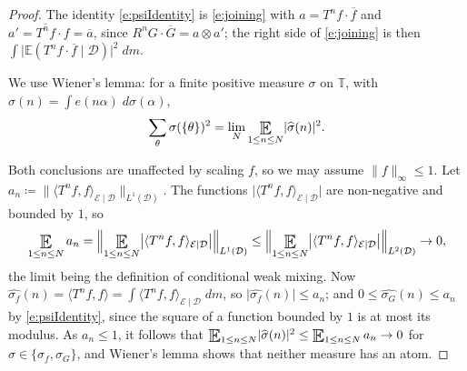 \begin{proof}
The identity \eqref{e:psiIdentity} is \eqref{e:joining} with $a = T ^{n}f\cdot \overline f$ and $a' = \overline{T ^{n}f}\cdot f = \overline a$, 
since $R ^{n}G\cdot \overline G = a \otimes a'$; the right side of \eqref{e:joining} is then $\int \lvert \mathbb E(T ^{n}f\cdot\overline f\mid \mathcal D)\rvert ^2 \;dm$.  

We use Wiener's lemma: for a finite positive measure $\sigma$ on $\mathbb T$, with $\widehat\sigma (n) = \int e(n \alpha )\;d \sigma (\alpha )$, 
\begin{equation}
\sum _{\theta} \sigma ( \{\theta\}) ^2 = \lim_N \Expectation_{1\leq n\leq N} \lvert \widehat\sigma (n)\rvert ^2 . 
\end{equation}

Both conclusions are unaffected by scaling $f$, so we may assume $\lVert f\rVert _{\infty} \leq 1$.  
Let $a_n \coloneqq \lVert \langle T ^{n}f,f\rangle _{\mathcal E\mid \mathcal D}\rVert _{L ^{1}(\mathcal D)}$.  
The functions $\lvert \langle T ^{n}f,f\rangle _{\mathcal E\mid \mathcal D}\rvert$ are non-negative and bounded by $1$, so 
\begin{equation}
\Expectation_{1\leq n\leq N} a_n = \Bigl\lVert \Expectation_{1\leq n\leq N} \bigl\lvert \langle T ^{n}f,f\rangle _{\mathcal E\mid \mathcal D}\bigr\rvert \Bigr\rVert _{L ^{1}(\mathcal D)} 
\leq \Bigl\lVert \Expectation_{1\leq n\leq N} \bigl\lvert \langle T ^{n}f,f\rangle _{\mathcal E\mid \mathcal D}\bigr\rvert \Bigr\rVert _{L ^{2}(\mathcal D)} \to 0 , 
\end{equation}
the limit being the definition of conditional weak mixing.  
Now $\widehat{\sigma _f}(n) = \langle T ^{n}f,f\rangle = \int \langle T ^{n}f,f\rangle _{\mathcal E\mid \mathcal D}\;dm$, so $\lvert \widehat{\sigma_f}(n)\rvert \leq a_n$; 
and $0 \leq \widehat{\sigma _G}(n) \leq a_n$ by \eqref{e:psiIdentity}, since the square of a function bounded by $1$ is at most its modulus.  
As $a_n \leq 1$, it follows that 
$\Expectation_{1\leq n\leq N} \lvert \widehat\sigma (n)\rvert ^2 \leq \Expectation_{1\leq n\leq N} a_n \to 0$ for $\sigma \in \{\sigma _f, \sigma _G\}$, 
and Wiener's lemma shows that neither measure has an atom.  
\end{proof}







